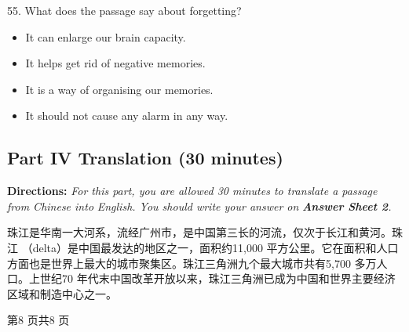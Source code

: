 \documentclass[UTF8,11pt]{ctexart}
\begin{document}
55. What does the passage say about forgetting?


\begin{itemize}[leftmargin=2em,itemsep=.2em,topsep=.4em]\item[A.] It can enlarge our brain capacity.
\item[B.] It helps get rid of negative memories.
\item[C.] It is a way of organising our memories.
\item[D.] It should not cause any alarm in any way.
\end{itemize}

\subsection*{\textbf{Part IV} \textbf{Translation} \textbf{(30 minutes)}}


\textbf{Directions:}\textit{ For this part, you are allowed 30 minutes to translate a passage from Chinese into} \textit{English. You should write your answer on}\textbf{\textit{ Answer Sheet 2}}\textit{.}


珠江是华南一大河系，流经广州市，是中国第三长的河流，仅次于长江和黄河。珠江 （delta）是中国最发达的地区之一，面积约11,000 平方公里。它在面积和人口方面也是世界上最大的城市聚集区。珠江三角洲九个最大城市共有5,700 多万人口。上世纪70 年代末中国改革开放以来，珠江三角洲已成为中国和世界主要经济区域和制造中心之一。


第8 页共8 页
\end{document}
